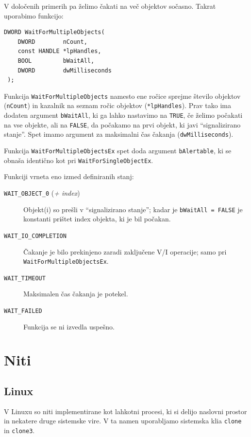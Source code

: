 \documentclass[a4paper,12pt,openright]{book}
\begin{document}
V določenih primerih pa želimo čakati na več objektov sočasno.
Takrat uporabimo funkcijo:
\begin{lstlisting}[style=func]
 DWORD WaitForMultipleObjects(
	DWORD        nCount,
	const HANDLE *lpHandles,
	BOOL         bWaitAll,
	DWORD        dwMilliseconds
 );
\end{lstlisting}

Funkcija \texttt{WaitForMultipleObjects} namesto ene ročice sprejme število objektov (\texttt{nCount}) in kazalnik na seznam ročic objektov (\texttt{*lpHandles}).
Prav tako ima dodaten argument \texttt{bWaitAll}, ki ga lahko nastavimo na \texttt{TRUE}, če želimo počakati na vse objekte, ali na \texttt{FALSE}, da počakamo na prvi objekt, ki javi ``signalizirano stanje''.
Spet imamo argument za maksimalni čas čakanja (\texttt{dwMilliseconds}).

Funkcija \texttt{WaitForMultipleObjectsEx} spet doda argument \texttt{bAlertable}, ki se obnaša identično kot pri \texttt{WaitForSingleObjectEx}.

Funkciji vrneta eno izmed definiranih stanj:
\begin{description}
	\item[\texttt{WAIT\_OBJECT\_0} (\textit{+ index})] Objekt(i) so prešli v ``signalizirano stanje''; kadar je \texttt{bWaitAll = FALSE} je konstanti prištet index objekta, ki je bil počakan.
	\item[\texttt{WAIT\_IO\_COMPLETION}] Čakanje je bilo prekinjeno zaradi zaključene V/I operacije; samo pri \texttt{WaitForMultipleObjectsEx}.
	\item[\texttt{WAIT\_TIMEOUT}] Maksimalen čas čakanja je potekel.
	\item[\texttt{WAIT\_FAILED}] Funkcija se ni izvedla uspešno.
\end{description}

\section{Niti} \label{sec:threads}

\subsection{Linux} \label{ssec:linux_syscalls:threads}

V Linuxu so niti implementirane kot lahkotni procesi, ki si delijo naslovni prostor in nekatere druge sistemske vire.
V ta namen uporabljamo sistemska klia \texttt{clone} in \texttt{clone3}.
\end{document}

